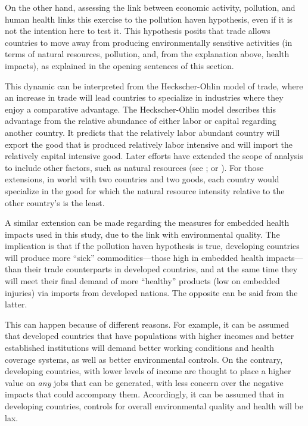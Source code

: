 \documentclass[a4paper,12pt, ]{article}
\begin{document}
On the other hand, assessing the link between economic activity, pollution, and human health links this exercise to the pollution haven hypothesis, even if it is not the intention here to test it. This hypothesis posits that trade allows countries to move away from producing environmentally sensitive activities (in terms of natural resources, pollution, and, from the explanation above, health impacts), as explained in the opening sentences of this section.

This dynamic can be interpreted from the Heckscher-Ohlin model of trade, where an increase in trade will lead countries to specialize in industries where they enjoy a comparative advantage. The Heckscher-Ohlin model describes this advantage from the relative abundance of either labor or capital regarding another country. It predicts that the relatively labor abundant country will export the good that is produced relatively labor intensive and will import the relatively capital intensive good. Later efforts have extended the scope of analysis to include other factors, such as natural resources (see \citealp{leamerleontief1980,leamersources1985}; or \citealp{bowenmulticountry1987}). For those extensions, in world with two countries and two goods, each country would  specialize in the good for which  the natural resource intensity relative to the other country's is the least.

A similar extension can be made regarding the measures for embedded health impacts used in this study, due to the link with environmental quality. The implication is that if the pollution haven hypothesis is true, developing countries will produce more ``sick'' commodities---those high in embedded health impacts---than their trade counterparts in developed countries, and at the same time they will meet their final demand of more ``healthy'' products (low on embedded injuries) via imports from developed nations. The opposite can be said from the latter.

This can happen because of different reasons. For example, it can be assumed that developed countries that have populations with higher incomes and better established institutions will demand better working conditions and health coverage systems, as well as better environmental controls. On the contrary, developing countries, with lower levels of income are thought to place a higher value on \textit{any} jobs that can be generated, with less concern over the negative impacts that could accompany them. Accordingly, it can be assumed that in developing countries, controls for overall environmental quality and health will be lax.
\end{document}
